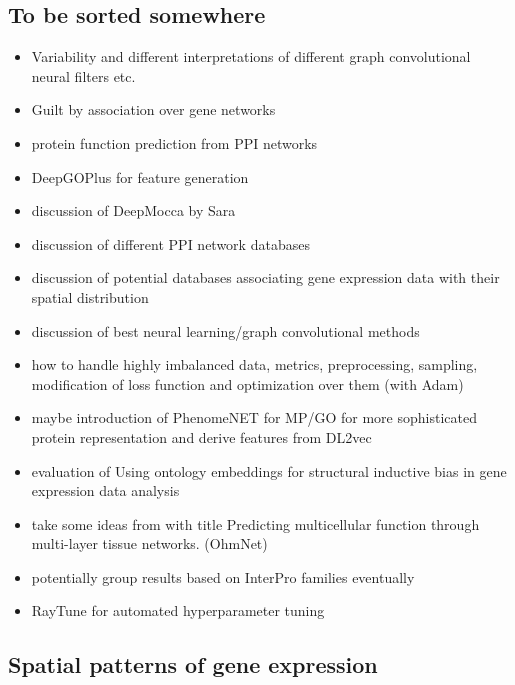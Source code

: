 \documentclass[]{article}
\renewcommand{\cite}{\citep}
\begin{document}
\subsection{To be sorted somewhere}
\begin{itemize}
	\item Variability and different interpretations of different graph convolutional neural filters \cite{GCNConv, GENConv2020, SAGEConv} etc.
	\item Guilt by association over gene networks \cite{Oliver2000, Gillis2012}
	\item protein function prediction from PPI networks \cite{Vazquez2003}
	\item DeepGOPlus for feature generation \cite{DeepGoPlus}
	\item discussion of DeepMocca by Sara \cite{DeepMocca2021}
	\item discussion of different PPI network databases \cite{STRINGv10}
	\item discussion of potential databases associating gene expression data with their spatial distribution \cite{hawrylycz_digital_2011}
	\item discussion of best neural learning/graph convolutional methods \cite{Pytorch, PytorchGeometric}
	\item how to handle highly imbalanced data, metrics, preprocessing, sampling, modification of loss function \cite{Jeni2013} and optimization over them (with Adam\cite{Adam2014})
	\item maybe introduction of PhenomeNET for MP/GO for more sophisticated protein representation \cite{PhenomeNET2011, GOoriginal2000, GOrecent2020, MP2009} and derive features from DL2vec \cite{DL2vec2020, Word2vec2013}
	\item evaluation of \glqq Using ontology embeddings for structural inductive bias in gene expression data analysis\grqq{}\cite{Trebacz2020}
	\item take some ideas from \citet{Zitnik2017} with title \glqq Predicting multicellular function through multi-layer tissue networks\grqq{}. (OhmNet)
	\item potentially group results based on InterPro\cite{Interpro2020} families eventually
	\item RayTune\cite{liaw2018tune} for automated hyperparameter tuning
\end{itemize}

\subsection{Spatial patterns of gene expression}
\end{document}
